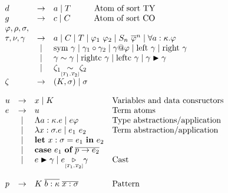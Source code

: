 {\begin{figure}[H]
\begin{minipage}[t]{0.45\linewidth}
$
\begin{array}{lcl}
  d & \to & a \alt T  \hspace{10mm} \textrm{Atom of sort TY}\\
  g & \to & c \alt C  \hspace{10mm}  \textrm{Atom of sort CO}\\
\varphi, \rho, \sigma, && \\
\tau, \nu, \gamma &
  \to & a \alt C \alt T \alt \varphi_1 ~ \varphi_2 \alt S_n ~
  \overline{\varphi}^n \alt \forall a:\kappa.\varphi \\
  & \alt & \textrm{sym} ~ \gamma \alt \gamma_1 \circ \gamma_2 \alt
  \gamma@\varphi \alt \textrm{left} ~ \gamma \alt \textrm{right} ~ \gamma \\
  & \alt & \gamma \sim \gamma \alt \textrm{rightc} ~ \gamma \alt
  \textrm{leftc} ~ \gamma \alt \gamma \blacktriangleright \gamma \\
  & \alt & \zeta_1 \tstack{\sim}{[T_1, T_2]} \zeta_2 \\
  \zeta & \to & (K, \sigma) \alt \sigma
\end{array}
$
\end{minipage}
\begin{minipage}[t]{0.5\linewidth}
\vspace{5mm}
\vspace{2mm}

$
\begin{array}{lcll}
  u & \to & x \;|\; K & \textrm{Variables and data consructors} \\
  e & \to & u & \textrm{Term atoms} \\
    & \;|\; & \Lambda a:\kappa.e \;|\; e \varphi & \textrm{Type abstractions/application} \\
    & \;|\; & \lambda x : \sigma.e \;|\; e_1 ~ e_2 & \textrm{Term abstraction/application} \\
    & \;|\; & \mbox{\bf{let}}~x:\sigma=e_1~\mbox{\bf{in}}~e_2 \\
    & \;|\; & \mbox{\bf{case}}~e_1~\mbox{\bf{of}}~\overline{p \to e_2} \\
    & \;|\; & e \blacktriangleright \gamma
      \;|\;   e {\underset{{\scriptscriptstyle [T_1,T_2]}}{\triangleright}} \gamma & \textrm{Cast}\\
    \\
p & \to & K \; \overline{b:\kappa} \; \overline{x:\sigma} & \textrm{Pattern}
\end{array}
$
\end{minipage}


\end{figure}}
